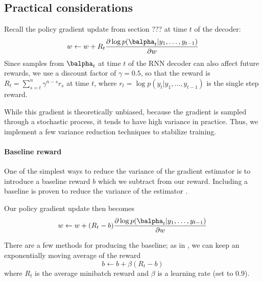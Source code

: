 \documentclass[11pt]{report}
\begin{document}
\subsection{Practical considerations}

Recall the policy gradient update from section ??? at time $t$ of the decoder:
\begin{equation}
w \gets w + R_t \frac{\partial \log p(\balpha_t | y_1, \ldots, y_{t-1})}{\partial w}
\end{equation}
Since samples from $\balpha_t$ at time $t$ of the RNN decoder can also affect future rewards, we use a discount factor of $\gamma = 0.5$, so that the reward is $R_t = \sum_{s = t}^n \gamma^{n-s}r_s$ at time $t$, where $r_t = \log p(y_t | y_1, \ldots, y_{t-1})$ is the single step reward.

While this gradient is theoretically unbiased, because the gradient is sampled through a stochastic process, it tends to have high variance in practice. Thus, we implement a few variance reduction techniques to stabilize training.

\paragraph{Baseline reward}
One of the simplest ways to reduce the variance of the gradient estimator is to introduce a baseline reward $b$ which we subtract from our reward. Including a baseline is proven to reduce the variance of the estimator \citep{mnih2014belief}. 



Our policy gradient update then becomes
\begin{equation}
w \gets w + (R_t - b) \frac{\partial \log p(\balpha_t | y_1, \ldots, y_{t-1})}{\partial w}
\end{equation}

There are a few methods for producing the baseline; as in \cite{xu2015captioning}, we can keep an exponentially moving average of the reward
\begin{equation}
b \gets b + \beta (R_t - b)
\end{equation}
where $R_t$ is the average minibatch reward and $\beta$ is a learning rate (set to 0.9).

\end{document}
